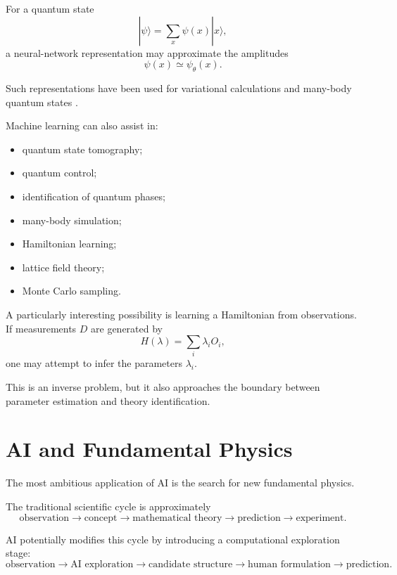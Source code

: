 \documentclass[11pt,a4paper]{article}
\begin{document}
For a quantum state
\begin{equation}
|\psi\rangle=
\sum_x \psi(x)|x\rangle,
\end{equation}
a neural-network representation may approximate the amplitudes
\begin{equation}
\psi(x)\simeq\psi_\theta(x).
\end{equation}

Such representations have been used for variational calculations and many-body
quantum states \cite{Carleo2017,Carleo2019}.

Machine learning can also assist in:

\begin{itemize}
\item quantum state tomography;
\item quantum control;
\item identification of quantum phases;
\item many-body simulation;
\item Hamiltonian learning;
\item lattice field theory;
\item Monte Carlo sampling.
\end{itemize}

A particularly interesting possibility is learning a Hamiltonian from
observations. If measurements $D$ are generated by
\begin{equation}
H(\lambda)=\sum_i\lambda_i O_i,
\end{equation}
one may attempt to infer the parameters $\lambda_i$.

This is an inverse problem, but it also approaches the boundary between
parameter estimation and theory identification.

\section{AI and Fundamental Physics}

The most ambitious application of AI is the search for new fundamental physics.

The traditional scientific cycle is approximately
\begin{equation}
\text{observation}
\rightarrow
\text{concept}
\rightarrow
\text{mathematical theory}
\rightarrow
\text{prediction}
\rightarrow
\text{experiment}.
\end{equation}

AI potentially modifies this cycle by introducing a computational exploration
stage:
\begin{equation}
\text{observation}
\rightarrow
\boxed{\text{AI exploration}}
\rightarrow
\text{candidate structure}
\rightarrow
\text{human formulation}
\rightarrow
\text{prediction}.
\end{equation}
\end{document}
